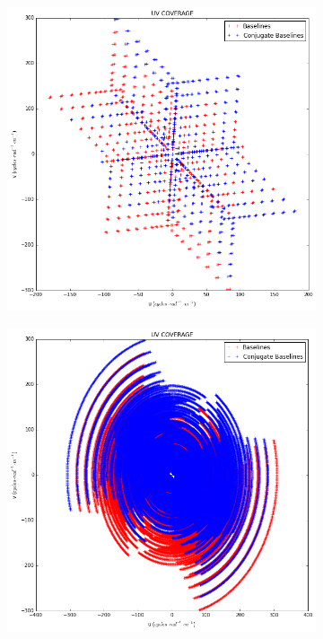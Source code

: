 \begin{figure}[h]
\begin{mdframed}
\begin{subfigure}[b]{0.32\textwidth}
  \caption{}
 \end{subfigure}
 \begin{subfigure}[b]{0.32\textwidth}
  \includegraphics[width=\textwidth]{images/evla_observation/5min_snapshot_ncp.png}
  \caption{}
 \end{subfigure}
 \begin{subfigure}[b]{0.32\textwidth}
  \includegraphics[width=\textwidth]{images/evla_observation/6hr_ncp.png}

\end{subfigure}
\end{mdframed}
\end{figure}
